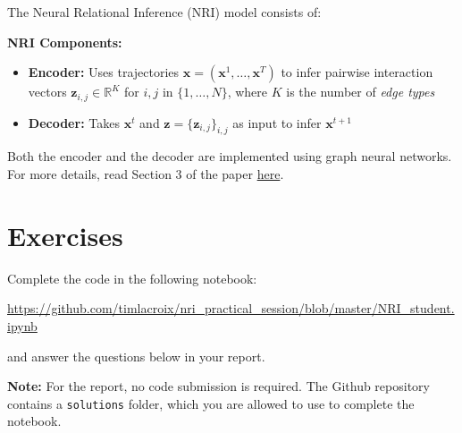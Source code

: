 \documentclass[11pt]{article}
\begin{document}
The Neural Relational Inference (NRI) model consists of:

\begin{infobox}
\textbf{NRI Components:}

\begin{itemize}[leftmargin=*]
	\item \textbf{Encoder:} Uses trajectories $\mathbf{x} = (\mathbf{x}^1, \ldots, \mathbf{x}^T)$ to infer pairwise interaction vectors $\mathbf{z}_{i, j} \in \mathbb{R}^K$ for $i, j$ in $\{1, \ldots, N \}$, where $K$ is the number of \emph{edge types}

	\item \textbf{Decoder:} Takes $\mathbf{x}^t$ and $\mathbf{z} = \{\mathbf{z}_{i, j}\}_{i,j}$ as input to infer $\mathbf{x}^{t+1}$
\end{itemize}
\end{infobox}

Both the encoder and the decoder are implemented using graph neural networks.
For more details, read Section 3 of the paper
\href{https://arxiv.org/pdf/1802.04687.pdf}{here}.

\section{Exercises}

Complete the code in the following notebook:

\begin{center}
\url{https://github.com/timlacroix/nri_practical_session/blob/master/NRI_student.ipynb}
\end{center}

and answer the questions below in your report.

\begin{tcolorbox}[colback=lightgray,colframe=darkblue,arc=2mm,boxrule=1pt]
\textbf{Note:} For the report, no code submission is required. The Github repository
contains a \texttt{solutions} folder, which you are allowed to use to complete the notebook.
\end{tcolorbox}
\end{document}

